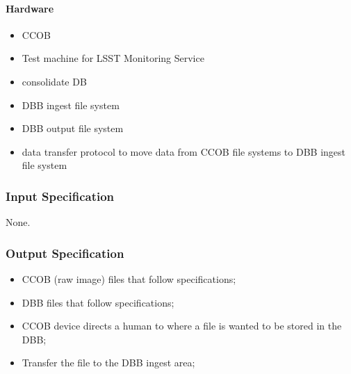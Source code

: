\paragraph{Hardware}
\begin{itemize}
\tightlist
\item
  CCOB
\item
  Test machine for LSST Monitoring Service
\item
  consolidate DB~
\item
  DBB ingest file system~
\item
  DBB output file system~
\item
  data transfer protocol to move data from CCOB file systems to DBB
  ingest file system~
\end{itemize}


\subsubsection{Input Specification}
None.


\subsubsection{Output Specification}
\begin{itemize}
\tightlist
\item
  CCOB (raw image) files that follow specifications;
\item
  DBB files that follow specifications;
\item
  CCOB device directs a human to where a file is wanted to be stored in
  the DBB;
\item
  Transfer the file to the DBB ingest area;
\end{itemize}


